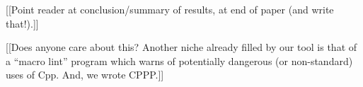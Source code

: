 \documentclass[10pt]{article}
\def\numpackages{30}
\begin{document}
[[Point reader at conclusion/summary of results, at end of paper (and write
that!).]]

% 
% 
% 
% 
% 


[[Does anyone care about this?
Another niche already filled by our tool is that of a ``macro lint''
program which warns of potentially dangerous (or non-standard) uses of Cpp.
And, we wrote CPPP.]]



\end{document}
